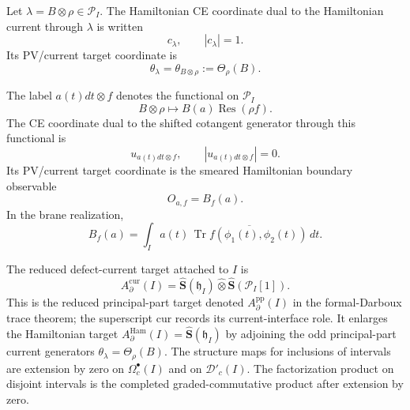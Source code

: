 \begin{defn}
\label{def:app-factorization-current-coordinates}
  Let \(\lambda=B\otimes\rho\in\mathcal P_I\).  The Hamiltonian CE
  coordinate dual to the Hamiltonian current through \(\lambda\) is
  written
  \[
    c_\lambda,\qquad |c_\lambda|=1 .
  \]
  Its PV/current target coordinate is
  \[
    \theta_\lambda=\theta_{B\otimes\rho}:=\Theta_\rho(B).
  \]

  The label \(a(t)dt\otimes f\) denotes the functional on
  \(\mathcal P_I\)
  \[
    B\otimes\rho\longmapsto B(a)\operatorname{Res}(\rho f).
  \]
  The CE coordinate dual to the shifted cotangent generator through this
  functional is
  \[
    u_{a(t)dt\otimes f},\qquad |u_{a(t)dt\otimes f}|=0.
  \]
  Its PV/current target coordinate is the smeared Hamiltonian boundary
  observable
  \[
    O_{a,f}=B_f(a).
  \]
  In the brane realization,
  \[
    B_f(a)=
      \int_I a(t)\,
      \overline{\operatorname{Tr}f(\phi_1(t),\phi_2(t))}\,dt .
  \]
\end{defn}

\begin{defn}
\label{def:app-factorization-enlarged-current-target}
  The reduced defect-current target attached to \(I\) is
  \[
    A_\partial^{\mathrm{cur}}(I)
      =
      \widehat{\mathbf S}(\mathfrak h_I)
      \widehat\otimes
      \widehat{\mathbf S}(\mathcal P_I[1]).
  \]
  This is the reduced principal-part target denoted
  \(A_\partial^{\mathrm{pp}}(I)\) in the formal-Darboux trace theorem; the superscript
  \(\mathrm{cur}\) records its current-interface role.
  It enlarges the Hamiltonian target
  \(A_\partial^{\mathrm{Ham}}(I)=\widehat{\mathbf S}(\mathfrak h_I)\)
  by adjoining the odd principal-part current generators
  \(\theta_\lambda=\Theta_\rho(B)\).  The structure maps for
  inclusions of intervals are extension by zero on
  \(\Omega^\bullet_c(I)\) and on \(\mathcal D'_c(I)\).  The
  factorization product on disjoint intervals is the completed
  graded-commutative product after extension by zero.
\end{defn}

